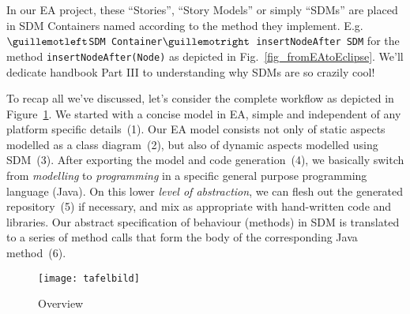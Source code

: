 In our EA project, these ``Stories'', ``Story Models'' or simply ``SDMs'' are  placed in SDM Containers named according to the method they implement.
E.g.  \texttt{$\guillemotleft$SDM Container$\guillemotright$ insertNodeAfter SDM} for the method  \texttt{insertNodeAfter(Node)} as depicted in
Fig.~\ref{fig_fromEAtoEclipse}.  We'll dedicate handbook Part III to understanding why SDMs are so  {\huge crazily} cool!
 
To recap all we've discussed, let's consider the complete workflow as depicted in Figure~\ref{fig_Overview}.
We started with a concise model in EA, simple and independent of any platform specific details~(1).  Our EA model consists not only of static aspects modelled
as a class diagram~(2), but also of dynamic aspects modelled using SDM~(3).  After exporting the model and code generation~(4), we basically switch from
\emph{modelling} to \emph{programming} in a specific general purpose programming language (Java).
On this lower \emph{level of abstraction}, we can flesh out the generated repository~(5) if necessary, and mix as appropriate with hand-written code and
libraries.  Our abstract specification of behaviour (methods) in SDM is translated to a series of method calls that form the body of the corresponding Java
method~(6).


\vspace{1.5cm}

\begin{figure}[htbp]
	\centering
  \texttt{[image: tafelbild]}
	\caption{Overview}
	\label{fig_Overview}
\end{figure}

\newpage